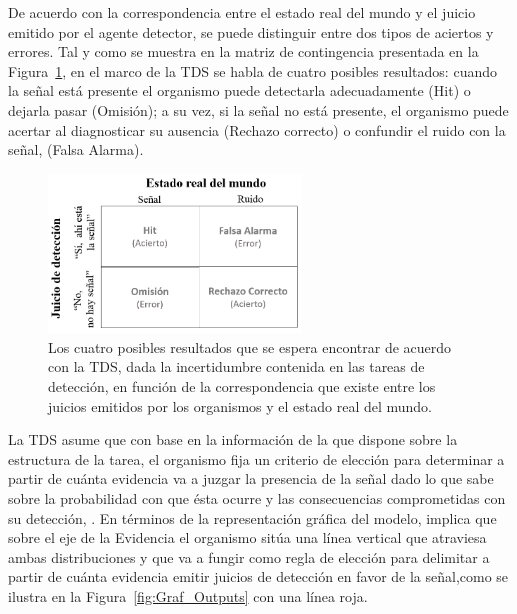 De acuerdo con la correspondencia entre el estado real del mundo y el juicio emitido por el agente detector, se puede distinguir entre dos tipos de aciertos y errores. Tal y como se muestra en la matriz de contingencia presentada en la Figura~\ref{fig:Mat_Output}, en el marco de la TDS se habla de cuatro posibles resultados: cuando la señal está presente el organismo puede detectarla adecuadamente (Hit) o dejarla pasar (Omisión); a su vez, si la señal no está presente, el organismo puede acertar al diagnosticar su ausencia (Rechazo correcto) o confundir el ruido con la señal, (Falsa Alarma).\\

\begin{figure}[th]
\centering
\includegraphics[width=0.60\textwidth]{Figures/Matriz_Outputs} 
\caption[Posibles Resultados en una Tarea de Detección]{Los cuatro posibles resultados que se espera encontrar de acuerdo con la TDS, dada la incertidumbre contenida en las tareas de detección, en función de la correspondencia que existe entre los juicios emitidos por los organismos y el estado real del mundo.}
\label{fig:Mat_Output}
\end{figure}

La TDS asume que con base en la información de la que dispone sobre la estructura de la tarea, el organismo fija un criterio de elección para determinar a partir de cuánta evidencia va a juzgar la presencia de la señal dado lo que sabe sobre la probabilidad con que ésta ocurre y las consecuencias comprometidas con su detección, \parencite{Swets1961}. En términos de la representación gráfica del modelo, implica que sobre el eje de la Evidencia el organismo sitúa una línea vertical que atraviesa ambas distribuciones y que va a fungir como regla de elección para delimitar a partir de cuánta evidencia  emitir juicios de detección en favor de la señal,como se ilustra en la Figura~\ref{fig:Graf_Outputs} con una línea roja.\\

